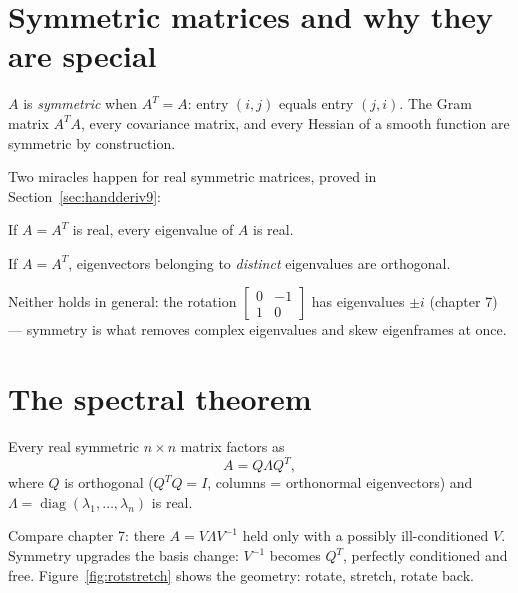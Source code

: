 \section{Symmetric matrices and why they are special}\label{sec:sym-special}

\begin{definition}
$A$ is \emph{symmetric} when $A^{T}=A$: entry $(i,j)$ equals entry
$(j,i)$. The Gram matrix $A^{T}A$, every covariance matrix, and every
Hessian of a smooth function are symmetric by construction.
\end{definition}

Two miracles happen for real symmetric matrices, proved in
Section~\ref{sec:handderiv9}:

\begin{theorem}
If $A=A^{T}$ is real, every eigenvalue of $A$ is real.
\end{theorem}

\begin{theorem}
If $A=A^{T}$, eigenvectors belonging to \emph{distinct} eigenvalues are
orthogonal.
\end{theorem}

Neither holds in general: the rotation
$\begin{bmatrix}0&-1\\1&0\end{bmatrix}$ has eigenvalues $\pm i$
(chapter 7) --- symmetry is what removes complex eigenvalues and skew
eigenframes at once.

\section{The spectral theorem}\label{sec:spectral}

\begin{theorem}
Every real symmetric $n\times n$ matrix factors as
\[
A=Q\Lambda Q^{T},
\]
where $Q$ is orthogonal ($Q^{T}Q=I$, columns = orthonormal eigenvectors)
and $\Lambda=\operatorname{diag}(\lambda_1,\dots,\lambda_n)$ is real.
\end{theorem}

Compare chapter 7: there $A=V\Lambda V^{-1}$ held only with a possibly
ill-conditioned $V$. Symmetry upgrades the basis change:
$V^{-1}$ becomes $Q^{T}$, perfectly conditioned and free.
Figure~\ref{fig:rotstretch} shows the geometry: rotate, stretch,
rotate back.

